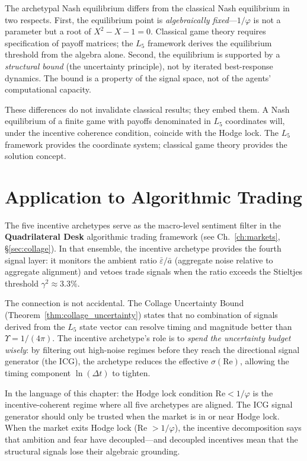 \begin{remark}
The archetypal Nash equilibrium differs from the classical Nash equilibrium in two respects. First, the equilibrium point is \emph{algebraically fixed}---$1/\varphi$ is not a parameter but a root of $X^2 - X - 1 = 0$. Classical game theory requires specification of payoff matrices; the $L_5$ framework derives the equilibrium threshold from the algebra alone. Second, the equilibrium is supported by a \emph{structural bound} (the uncertainty principle), not by iterated best-response dynamics. The bound is a property of the signal space, not of the agents' computational capacity.

These differences do not invalidate classical results; they embed them. A Nash equilibrium of a finite game with payoffs denominated in $L_5$ coordinates will, under the incentive coherence condition, coincide with the Hodge lock. The $L_5$ framework provides the coordinate system; classical game theory provides the solution concept.
\end{remark}

\section{Application to Algorithmic Trading}

The five incentive archetypes serve as the macro-level sentiment filter in the \textbf{Quadrilateral Desk} algorithmic trading framework (see Ch.~\ref{ch:markets}, \S\ref{sec:collage}). In that ensemble, the incentive archetype provides the fourth signal layer: it monitors the ambient ratio $\bar\varepsilon / \bar{a}$ (aggregate noise relative to aggregate alignment) and vetoes trade signals when the ratio exceeds the Stieltjes threshold $\gamma^2 \approx 3.3\%$.

The connection is not accidental. The Collage Uncertainty Bound (Theorem~\ref{thm:collage_uncertainty}) states that no combination of signals derived from the $L_5$ state vector can resolve timing and magnitude better than $\Upsilon = 1/(4\pi)$. The incentive archetype's role is to \emph{spend the uncertainty budget wisely}: by filtering out high-noise regimes before they reach the directional signal generator (the ICG), the archetype reduces the effective $\sigma(\mathrm{Re})$, allowing the timing component $\ln(\Delta t)$ to tighten.

In the language of this chapter: the Hodge lock condition $\mathrm{Re} < 1/\varphi$ is the incentive-coherent regime where all five archetypes are aligned. The ICG signal generator should only be trusted when the market is in or near Hodge lock. When the market exits Hodge lock (Re $> 1/\varphi$), the incentive decomposition says that ambition and fear have decoupled---and decoupled incentives mean that the structural signals lose their algebraic grounding.

